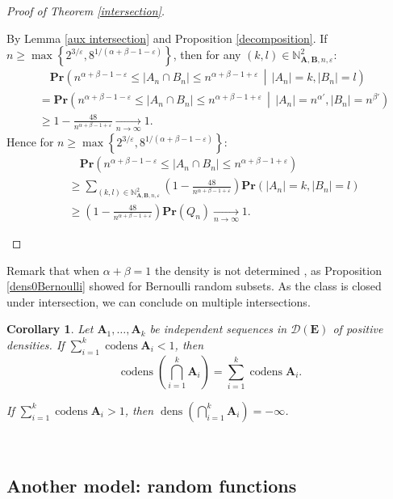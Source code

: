 \documentclass{article}
\DeclareMathOperator{\dens}{dens}
\DeclareMathOperator{\codens}{codens}
\newcommand{\bs}{\boldsymbol}
\newcommand{\tendvers}{\xrightarrow[n\to\infty]{}}
\def\Pr{\mathbf{Pr}}
\newtheorem{cor}[thm]{Corollary}
\theoremstyle{remark}
\begin{document}
\begin{proof}[Proof of Theorem \ref{intersection}]
\begin{enumerate}[(i)]
        By Lemma \ref{aux intersection} and Proposition \ref{decomposition}. If $n\geq \max\left\{2^{3/\varepsilon},8^{1/(\alpha+\beta-1-\varepsilon)}\right\}$, then for any $(k,l)\in \mathbb{N}^2_{\bs A,\bs B, n, \varepsilon}$:
        \[\begin{split} &\quad \Pr\left(n^{\alpha+\beta-1-\varepsilon}\leq |A_n\cap B_n|\leq n^{\alpha+\beta-1+\varepsilon} \,\middle|\, |A_n|= k,|B_n| = l \right)\\
        & = \Pr\left(n^{\alpha+\beta-1-\varepsilon}\leq |A_n\cap B_n|\leq n^{\alpha+\beta-1+\varepsilon} \,\middle|\, |A_n|=n^{\alpha'},|B_n| = n^{\beta'}\right)\\
        & \geq 1-\frac{48}{n^{\alpha+\beta-1+\varepsilon}} \tendvers 1.
        \end{split}
        \]
        Hence for $n\geq \max\left\{2^{3/\varepsilon},8^{1/(\alpha+\beta-1-\varepsilon)}\right\}$:
        \[\begin{split} & \quad \Pr(n^{\alpha+\beta-1-\varepsilon}\leq|A_n\cap B_n|\leq n^{\alpha+\beta-1+\varepsilon})\\
        &\geq \sum_{(k,l)\in\mathbb{N}^2_{\bs A,\bs B, n, \varepsilon}} \left( 1-\frac{48}{n^{\alpha+\beta-1+\varepsilon}} \right) \Pr(|A_n|=k, |B_n|=l)\\
        &\geq \left(1-\frac{48}{n^{\alpha+\beta-1+\varepsilon}}\right)\Pr(Q_n)\tendvers 1.
        \end{split}\]
            
    \end{enumerate}
\end{proof}

Remark that when $\alpha+\beta = 1$ the density is not determined , as Proposition \ref{dens0Bernoulli} showed for Bernoulli random subsets. As the class is closed under intersection, we can conclude on multiple intersections.

\begin{cor} Let $\bs A_1, \dots,\bs A_k$ be independent sequences in $\mathcal{D}(\bs E)$ of positive densities. If $\displaystyle{\sum_{i=1}^k\codens \bs A_i<1}$, then
\[\codens\left(\bigcap_{i=1}^k \bs A_i\right) = \sum_{i=1}^k\codens \bs A_i.\]

If $\displaystyle{\sum_{i=1}^k\codens \bs A_i > 1}$, then $\dens\left(\bigcap_{i=1}^k \bs A_i\right) = -\infty$.
\end{cor}\quad\\

\subsection{Another model: random functions}
\end{document}

